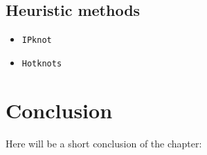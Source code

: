 \subsection{Heuristic methods}
\begin{itemize}
	\item \texttt{IPknot}
	\item \texttt{Hotknots}
\end{itemize}


\section{Conclusion}
Here will be a short conclusion of the chapter: 
